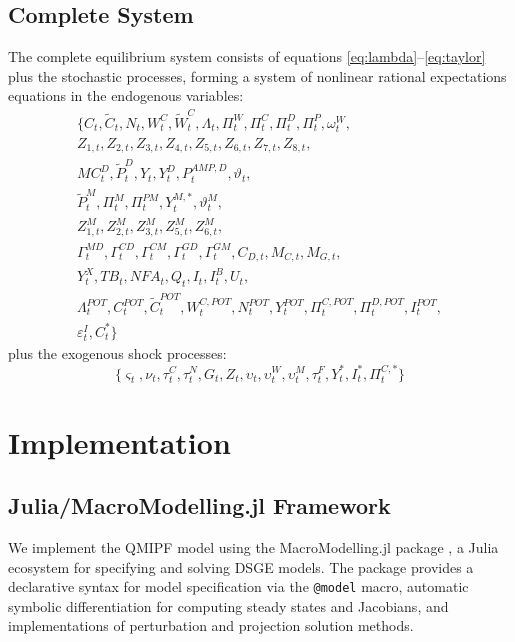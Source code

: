 \documentclass[12pt]{article}
\begin{document}
\subsection{Complete System}

The complete equilibrium system consists of equations \eqref{eq:lambda}--\eqref{eq:taylor} plus the stochastic processes, forming a system of nonlinear rational expectations equations in the endogenous variables:
\begin{multline*}
\{ C_t, \tilde{C}_t, N_t, W_t^C, \tilde{W}_t^C, \Lambda_t, \Pi_t^W, \Pi_t^C, \Pi_t^D, \Pi_t^P, \omega_t^W, \\
Z_{1,t}, Z_{2,t}, Z_{3,t}, Z_{4,t}, Z_{5,t}, Z_{6,t}, Z_{7,t}, Z_{8,t}, \\
MC_t^D, \tilde{P}_t^D, Y_t, Y_t^D, P_t^{AMP,D}, \vartheta_t, \\
\tilde{P}_t^M, \Pi_t^M, \Pi_t^{PM}, Y_t^{M,*}, \vartheta_t^M, \\
Z_{1,t}^M, Z_{2,t}^M, Z_{3,t}^M, Z_{5,t}^M, Z_{6,t}^M, \\
\Gamma_t^{MD}, \Gamma_t^{CD}, \Gamma_t^{CM}, \Gamma_t^{GD}, \Gamma_t^{GM}, C_{D,t}, M_{C,t}, M_{G,t}, \\
Y_t^X, TB_t, NFA_t, Q_t, I_t, I_t^B, U_t, \\
\Lambda_t^{POT}, C_t^{POT}, \tilde{C}_t^{POT}, W_t^{C,POT}, N_t^{POT}, Y_t^{POT}, \Pi_t^{C,POT}, \Pi_t^{D,POT}, I_t^{POT}, \\
\varepsilon_t^I, C_t^* \}
\end{multline*}
plus the exogenous shock processes:
\[
\{ \varsigma_t, \nu_t, \tau_t^C, \tau_t^N, G_t, Z_t, \upsilon_t, \upsilon_t^W, \upsilon_t^M, \tau_t^F, Y_t^*, I_t^*, \Pi_t^{C,*} \}
\]

\section{Implementation}\label{sec:implementation}

\subsection{Julia/MacroModelling.jl Framework}

We implement the QMIPF model using the MacroModelling.jl package \citep{MacroModellingJL}, a Julia ecosystem for specifying and solving DSGE models. The package provides a declarative syntax for model specification via the \texttt{@model} macro, automatic symbolic differentiation for computing steady states and Jacobians, and implementations of perturbation and projection solution methods.
\end{document}
